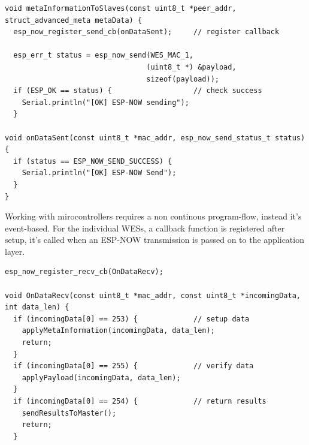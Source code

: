 \newpage

\begin{lstlisting}[caption=Send ESP-NOW Cast UC/BC]
void metaInformationToSlaves(const uint8_t *peer_addr, struct_advanced_meta metaData) {
  esp_now_register_send_cb(onDataSent);     // register callback

  esp_err_t status = esp_now_send(WES_MAC_1,
                                 (uint8_t *) &payload,
                                 sizeof(payload));
  if (ESP_OK == status) {                   // check success
    Serial.println("[OK] ESP-NOW sending"); 
  }

void onDataSent(const uint8_t *mac_addr, esp_now_send_status_t status) {
  if (status == ESP_NOW_SEND_SUCCESS) {
    Serial.println("[OK] ESP-NOW Send"); 
  }
}
\end{lstlisting}
\label{lst:sendcast}

Working with mirocontrollers requires a non continous program-flow, instead it's event-based.
For the individual WESs, a callback function is registered after setup, 
it's called when an ESP-NOW transmission is passed on to the application layer.

\begin{lstlisting}[caption=ESP-NOW Callback Functions]
esp_now_register_recv_cb(OnDataRecv);

void OnDataRecv(const uint8_t *mac_addr, const uint8_t *incomingData, int data_len) {
  if (incomingData[0] == 253) {             // setup data
    applyMetaInformation(incomingData, data_len);
    return;
  }
  if (incomingData[0] == 255) {             // verify data
    applyPayload(incomingData, data_len);
  }
  if (incomingData[0] == 254) {             // return results
    sendResultsToMaster();
    return;
  }
\end{lstlisting}
\label{lst:callback}
